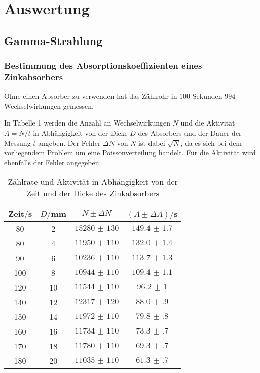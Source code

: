 \section{Auswertung}
\label{sec:Auswertung}

\subsection{Gamma-Strahlung}
\subsubsection{Bestimmung des Absorptionskoeffizienten eines Zinkabsorbers}
Ohne einen Absorber zu verwenden hat das Zählrohr in $100$ Sekunden $994$ Wechselwirkungen gemessen.

In Tabelle 1 werden die Anzahl an Wechselwirkungen $N$ und die Aktivität $A = N/t$ in Abhängigkeit von der Dicke $D$ des Absorbers und der
Dauer der Messung $t$ angeben. Der Fehler $\Delta N$ von $N$ ist dabei $\sqrt{N}$, da es sich bei dem vorliegendem Problem um eine
Poissonverteilung handelt. Für die Aktivität wird ebenfalls der Fehler angegeben.

\begin{table}[H]
  \centering
  \caption{Zählrate und Aktivität in Abhängigkeit von der Zeit und der Dicke des Zinkabsorbers}
  \label{tab:Rechteckspannung}
  \begin{tabular}{c c c c}
    \toprule
    Zeit$/$s & $D/$mm & $N \pm \Delta N$ & $(A \pm \Delta A)/$s\\
    \midrule
    80 & 2 & $\num{15280(130)}$  &  $\num{149.4(17)}$ \\
    80 & 4 & $\num{11950(110)}$ &   $\num{132.0(14)}$ \\
    90 & 6 & $\num{10236(110)}$ &   $\num{113.7(13)}$ \\
    100 & 8 & $\num{10944(110)}$ &  $\num{109.4(11)}$ \\
    120 & 10 & $\num{11544(110)}$ & $\num{96.2(10)}$ \\
    140 & 12 & $\num{12317(120)}$ & $\num{88.0(9)}$ \\
    150 & 14 & $\num{11972(110)}$ & $\num{79.8(8)}$ \\
    160 & 16 & $\num{11734(110)}$ & $\num{73.3(7)}$ \\
    170 & 18 & $\num{11780(110)}$ & $\num{69.3(7)}$ \\
    180 & 20 & $\num{11035(110)}$ & $\num{61.3(7)}$ \\
    \bottomrule
  \end{tabular}
\end{table}

